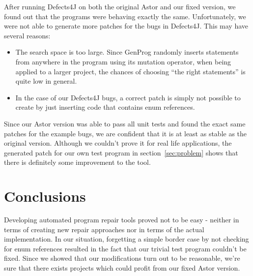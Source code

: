 \documentclass[pdftex,english,oribibl]{llncs}
\begin{document}
After running Defects4J on both the original Astor and our fixed version, we found out that the programs were behaving exactly the same. Unfortunately, we were not able to generate more patches for the bugs in Defects4J.
This may have several reasons: 
\begin{itemize}
	\item The search space is too large. Since GenProg randomly inserts statements from anywhere in the program using its mutation operator, when being applied to a larger project, the chances of choosing ``the right statements'' is quite low in general.
	\item In the case of our Defects4J bugs, a correct patch is simply not possible to create by just inserting code that contains enum references.
\end{itemize}
Since our Astor version was able to pass all unit tests and found the exact same patches for the example bugs, we are confident that it is at least as stable as the original version. Although we couldn't prove it for real life applications, the generated patch for our own test program in section~\ref{sec:problem} shows that there is definitely some improvement to the tool.

\section{Conclusions}\label{sec:conclusions}

Developing automated program repair tools proved not to be easy - neither in terms of creating new repair approaches nor in terms of the actual implementation. In our situation, forgetting a simple border case by not checking for enum references resulted in the fact that our trivial test program couldn't be fixed. 
Since we showed that our modifications turn out to be reasonable, we're sure that there exists projects which could profit from our fixed Astor version. 


\end{document}
